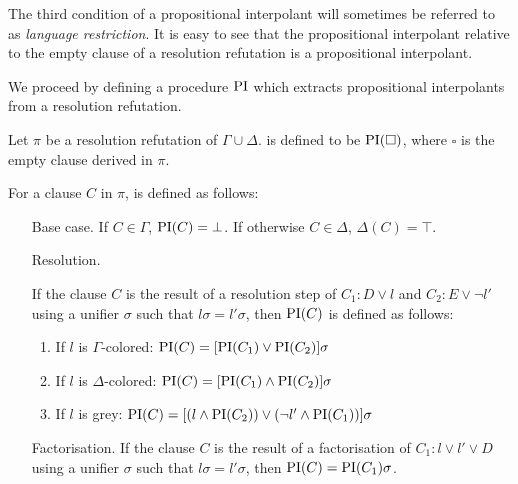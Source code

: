 The third condition of a propositional interpolant will sometimes be referred to as \emph{language restriction}.
It is easy to see that the propositional interpolant relative to the empty clause of a resolution refutation is a propositional interpolant.

We proceed by defining a procedure $\operatorname{PI}$ which extracts propositional interpolants from a resolution refutation.

\begin{defi}
	Let $\pi$ be a resolution refutation of $\Gamma \cup \Delta$.
	 is defined to be $\operatorname{PI}(\square)$, where $\square$ is the empty clause derived in $\pi$.

	For a clause $C$ in $\pi$,  is defined as follows:
	\label{def:PI}
	\begin{itemize}
		\item[Base case.]
			If $C \in \Gamma$, $\operatorname{PI}(C) = \bot$. 
			If otherwise $C \in \Delta$, $\Delta(C) = \top$. 
		\item[Resolution.]
			\label{def:PI_resolution}

			If the clause $C$ is the result of a resolution step of $C_1: D \lor l$ and $C_2: E \lor \lnot l'$ using a unifier $\sigma$ such that $l\sigma = l'\sigma$, then $\operatorname{PI}(C)$ is defined as follows:
			\begin{enumerate}
				\item If $l$ is $\Gamma$-colored: $\operatorname{PI}(C) = [\operatorname{PI}(C_1) \lor \operatorname{PI}(C_2)]\sigma$
				\item If $l$ is $\Delta$-colored: $\operatorname{PI}(C) = [\operatorname{PI}(C_1) \land \operatorname{PI}(C_2)]\sigma$
				\item If $l$ is grey: $\operatorname{PI}(C) = [(l \land \operatorname{PI}(C_2)) \lor (\lnot l' \land \operatorname{PI}(C_1)) ]\sigma $
			\end{enumerate}

		\item[Factorisation.]
			If the clause $C$ is the result of a factorisation of $C_1: l \lor l' \lor D$ using a unifier $\sigma$ such that $l\sigma = l'\sigma$, then $\operatorname{PI}(C) = \operatorname{PI}(C_1)\sigma$.


\end{itemize}
\end{defi}
